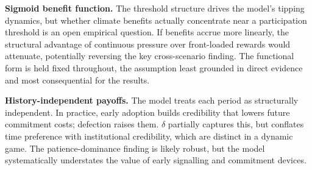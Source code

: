 \documentclass[12pt,a4paper]{article}
\begin{document}
\textbf{Sigmoid benefit function.} The threshold structure drives the model's tipping dynamics, but whether climate benefits actually concentrate near a participation threshold is an open empirical question. If benefits accrue more linearly, the structural advantage of continuous pressure over front-loaded rewards would attenuate, potentially reversing the key cross-scenario finding. The functional form is held fixed throughout, the assumption least grounded in direct evidence and most consequential for the results.

\textbf{History-independent payoffs.} The model treats each period as structurally independent. In practice, early adoption builds credibility that lowers future commitment costs; defection raises them. $\delta$ partially captures this, but conflates time preference with institutional credibility, which are distinct in a dynamic game. The patience-dominance finding is likely robust, but the model systematically understates the value of early signalling and commitment devices.
\end{document}
